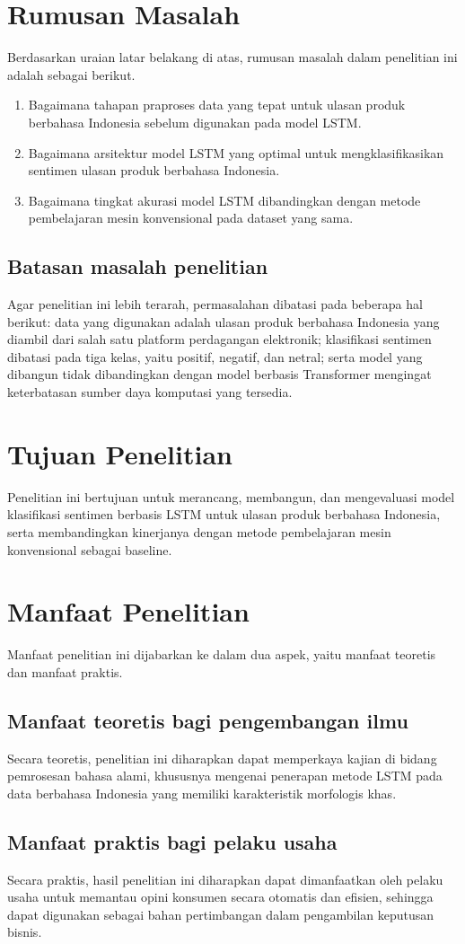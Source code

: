 \section{Rumusan Masalah}
Berdasarkan uraian latar belakang di atas, rumusan masalah dalam
penelitian ini adalah sebagai berikut.
\begin{enumerate}
  \item Bagaimana tahapan praproses data yang tepat untuk ulasan
        produk berbahasa Indonesia sebelum digunakan pada model LSTM.
  \item Bagaimana arsitektur model LSTM yang optimal untuk
        mengklasifikasikan sentimen ulasan produk berbahasa Indonesia.
  \item Bagaimana tingkat akurasi model LSTM dibandingkan dengan
        metode pembelajaran mesin konvensional pada dataset yang sama.
\end{enumerate}

\subsection{Batasan masalah penelitian}
Agar penelitian ini lebih terarah, permasalahan dibatasi pada
beberapa hal berikut: data yang digunakan adalah ulasan produk
berbahasa Indonesia yang diambil dari salah satu platform perdagangan
elektronik; klasifikasi sentimen dibatasi pada tiga kelas, yaitu
positif, negatif, dan netral; serta model yang dibangun tidak
dibandingkan dengan model berbasis Transformer mengingat keterbatasan
sumber daya komputasi yang tersedia.

\section{Tujuan Penelitian}
Penelitian ini bertujuan untuk merancang, membangun, dan mengevaluasi
model klasifikasi sentimen berbasis LSTM untuk ulasan produk
berbahasa Indonesia, serta membandingkan kinerjanya dengan metode
pembelajaran mesin konvensional sebagai baseline.

\section{Manfaat Penelitian}
Manfaat penelitian ini dijabarkan ke dalam dua aspek, yaitu manfaat
teoretis dan manfaat praktis.

\subsection{Manfaat teoretis bagi pengembangan ilmu}
Secara teoretis, penelitian ini diharapkan dapat memperkaya kajian di
bidang pemrosesan bahasa alami, khususnya mengenai penerapan metode
LSTM pada data berbahasa Indonesia yang memiliki karakteristik
morfologis khas.

\subsection{Manfaat praktis bagi pelaku usaha}
Secara praktis, hasil penelitian ini diharapkan dapat dimanfaatkan
oleh pelaku usaha untuk memantau opini konsumen secara otomatis dan
efisien, sehingga dapat digunakan sebagai bahan pertimbangan dalam
pengambilan keputusan bisnis.
